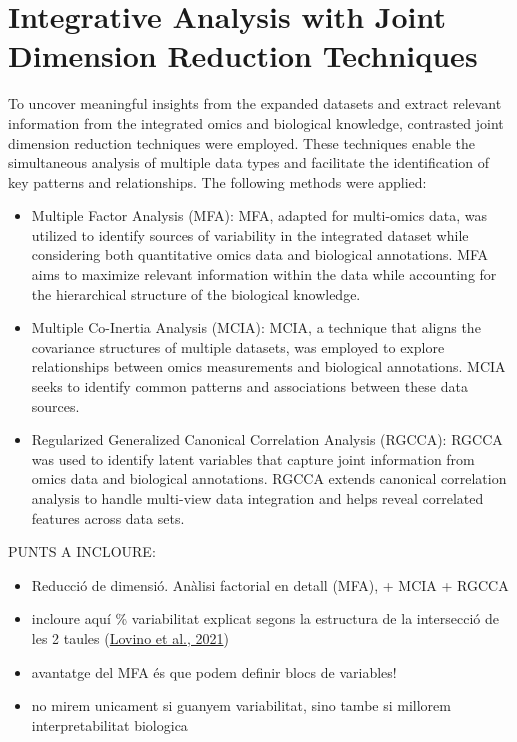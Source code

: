 \documentclass[a4paper, nobind]{templates/ociamthesis}
\begin{document}
\hypertarget{integrative-analysis-with-joint-dimension-reduction-techniques}{%
\section{Integrative Analysis with Joint Dimension Reduction Techniques}\label{integrative-analysis-with-joint-dimension-reduction-techniques}}

To uncover meaningful insights from the expanded datasets and extract relevant information from the integrated omics and biological knowledge, contrasted joint dimension reduction techniques were employed. These techniques enable the simultaneous analysis of multiple data types and facilitate the identification of key patterns and relationships. The following methods were applied:

\begin{itemize}
\item
  Multiple Factor Analysis (MFA): MFA, adapted for multi-omics data, was utilized to identify sources of variability in the integrated dataset while considering both quantitative omics data and biological annotations. MFA aims to maximize relevant information within the data while accounting for the hierarchical structure of the biological knowledge.
\item
  Multiple Co-Inertia Analysis (MCIA): MCIA, a technique that aligns the covariance structures of multiple datasets, was employed to explore relationships between omics measurements and biological annotations. MCIA seeks to identify common patterns and associations between these data sources.
\item
  Regularized Generalized Canonical Correlation Analysis (RGCCA): RGCCA was used to identify latent variables that capture joint information from omics data and biological annotations. RGCCA extends canonical correlation analysis to handle multi-view data integration and helps reveal correlated features across data sets.
\end{itemize}

PUNTS A INCLOURE:

\begin{itemize}
\item
  Reducció de dimensió. Anàlisi factorial en detall (MFA), + MCIA + RGCCA
\item
  incloure aquí \% variabilitat explicat segons la estructura de la intersecció de les 2 taules (\protect\hyperlink{ref-lovino_survey_2021}{Lovino et al., 2021})
\item
  avantatge del MFA és que podem definir blocs de variables!
\item
  no mirem unicament si guanyem variabilitat, sino tambe si millorem interpretabilitat biologica
\end{itemize}
\end{document}
